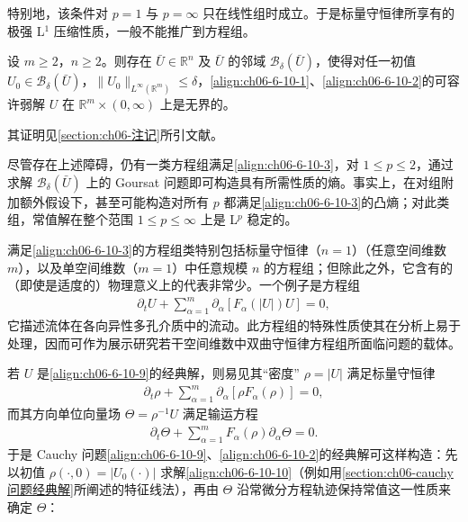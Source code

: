 \documentclass[../../main.tex]{subfiles}
\begin{document}
特别地，该条件对 $p=1$ 与 $p=\infty$ 只在线性组时成立。于是标量守恒律所享有的极强 L$^{1}$ 压缩性质，一般不能推广到方程组。

\begin{theorem}\label{theorem:ch06-6-10-2}
设 $m\geqslant 2$，$n\geqslant 2$。则存在 $\bar{U}\in\mathbb{R}^{n}$ 及 $\bar{U}$ 的邻域 $\mathscr{B}_{\delta}(\bar{U})$，使得对任一初值 $U_{0}\in\mathscr{B}_{\delta}(\bar{U})$，$\|U_{0}\|_{L^{\infty}(\mathbb{R}^{m})}\leqslant\delta$，\eqref{align:ch06-6-10-1}、\eqref{align:ch06-6-10-2}的可容许弱解 $U$ 在 $\mathbb{R}^{m}\times(0,\infty)$ 上是无界的。
\end{theorem}

其证明见\cref{section:ch06-注记}所引文献。


尽管存在上述障碍，仍有一类方程组满足\eqref{align:ch06-6-10-3}，对 $1\leqslant p\leqslant 2$，通过求解 $\mathscr{B}_{\delta}(\bar{U})$ 上的 Goursat 问题即可构造具有所需性质的熵。事实上，在对组附加额外假设下，甚至可能构造对所有 $p$ 都满足\eqref{align:ch06-6-10-3}的凸熵；对此类组，常值解在整个范围 $1\leqslant p\leqslant\infty$ 上是 L$^{p}$ 稳定的。

满足\eqref{align:ch06-6-10-3}的方程组类特别包括标量守恒律（$n=1$）（任意空间维数 $m$），以及单空间维数（$m=1$）中任意规模 $n$ 的方程组；但除此之外，它含有的（即使是适度的）物理意义上的代表非常少。一个例子是方程组
\begin{align}
\partial_{t}U+\sum_{\alpha=1}^{m}\partial_{\alpha}[F_{\alpha}(|U|)U]=0,
\label{align:ch06-6-10-9}
\end{align}
它描述流体在各向异性多孔介质中的流动。此方程组的特殊性质使其在分析上易于处理，因而可作为展示研究若干空间维数中双曲守恒律方程组所面临问题的载体。

若 $U$ 是\eqref{align:ch06-6-10-9}的经典解，则易见其“密度” $\rho=|U|$ 满足标量守恒律
\begin{align}
\partial_{t}\rho+\sum_{\alpha=1}^{m}\partial_{\alpha}[\rho F_{\alpha}(\rho)]=0,
\label{align:ch06-6-10-10}
\end{align}
而其方向单位向量场 $\Theta=\rho^{-1}U$ 满足输运方程
\begin{align}
\partial_{t}\Theta+\sum_{\alpha=1}^{m}F_{\alpha}(\rho)\partial_{\alpha}\Theta=0.
\label{align:ch06-6-10-11}
\end{align}
于是 Cauchy 问题\eqref{align:ch06-6-10-9}、\eqref{align:ch06-6-10-2}的经典解可这样构造：先以初值 $\rho(\cdot,0)=|U_{0}(\cdot)|$ 求解\eqref{align:ch06-6-10-10}（例如用\cref{section:ch06-cauchy问题经典解}所阐述的特征线法），再由 $\Theta$ 沿常微分方程轨迹保持常值这一性质来确定 $\Theta$：
\end{document}

